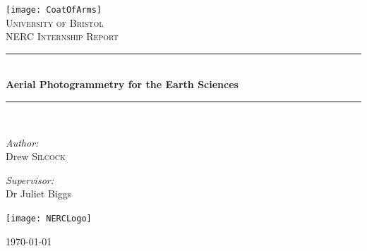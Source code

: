 \begin{titlepage}
\begin{center}

\newcommand{\HRule}{\rule{\linewidth}{0.5mm}}

\texttt{[image: CoatOfArms]}~\\[1cm]

\textsc{\LARGE University of Bristol}\\[1.5cm]


\textsc{\Large NERC Internship Report}\\[0.5cm]

\HRule \\[0.4cm]
{ \huge \bfseries Aerial Photogrammetry for the Earth Sciences}\\[0.4cm]

\HRule \\[1.5cm]

\begin{minipage}{0.4\textwidth}
\begin{flushleft} \large
\emph{Author:}\\
Drew \textsc{Silcock}
\end{flushleft}
\end{minipage}
\begin{minipage}{0.4\textwidth}
\begin{flushright} \large
\emph{Supervisor:} \\
Dr Juliet Biggs
\end{flushright}
\end{minipage}

\vspace{10mm}

\texttt{[image: NERCLogo]}~\\[1cm]

\vfill

{\large \longdate \today}

\end{center}
\end{titlepage}
